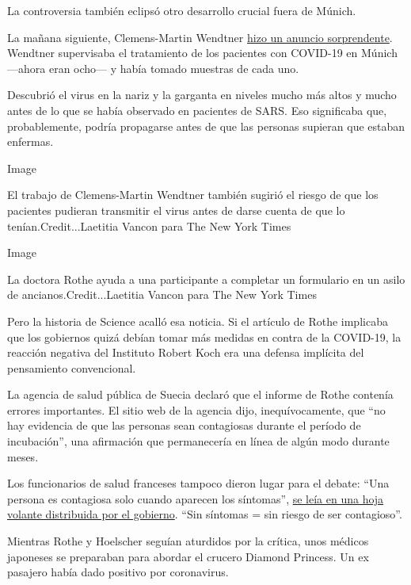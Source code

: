 La controversia también eclipsó otro desarrollo crucial fuera de Múnich.

La mañana siguiente, Clemens-Martin Wendtner
\href{https://instmikrobiobw.de/aktuelles/ansicht/pressemitteilung}{hizo
un anuncio sorprendente}. Wendtner supervisaba el tratamiento de los
pacientes con COVID-19 en Múnich ---ahora eran ocho--- y había tomado
muestras de cada uno.

Descubrió el virus en la nariz y la garganta en niveles mucho más altos
y mucho antes de lo que se había observado en pacientes de SARS. Eso
significaba que, probablemente, podría propagarse antes de que las
personas supieran que estaban enfermas.

Image

El trabajo de Clemens-Martin Wendtner también sugirió el riesgo de que
los pacientes pudieran transmitir el virus antes de darse cuenta de que
lo tenían.Credit...Laetitia Vancon para The New York Times

Image

La doctora Rothe ayuda a una participante a completar un formulario en
un asilo de ancianos.Credit...Laetitia Vancon para The New York Times

Pero la historia de Science acalló esa noticia. Si el artículo de Rothe
implicaba que los gobiernos quizá debían tomar más medidas en contra de
la COVID-19, la reacción negativa del Instituto Robert Koch era una
defensa implícita del pensamiento convencional.

La agencia de salud pública de Suecia declaró que el informe de Rothe
contenía errores importantes. El sitio web de la agencia dijo,
inequívocamente, que ``no hay evidencia de que las personas sean
contagiosas durante el período de incubación'', una afirmación que
permanecería en línea de algún modo durante meses.

Los funcionarios de salud franceses tampoco dieron lugar para el debate:
``Una persona es contagiosa solo cuando aparecen los síntomas'',
\href{https://www.lemonde.fr/les-decodeurs/article/2020/02/06/coronavirus-une-affiche-du-ministere-ecarte-trop-vite-le-risque-de-contagion-lors-de-l-incubation_6028658_4355770.html}{se
leía en una hoja volante distribuida por el gobierno}. ``Sin síntomas =
sin riesgo de ser contagioso''.

Mientras Rothe y Hoelscher seguían aturdidos por la crítica, unos
médicos japoneses se preparaban para abordar el crucero Diamond
Princess. Un ex pasajero había dado positivo por coronavirus.

